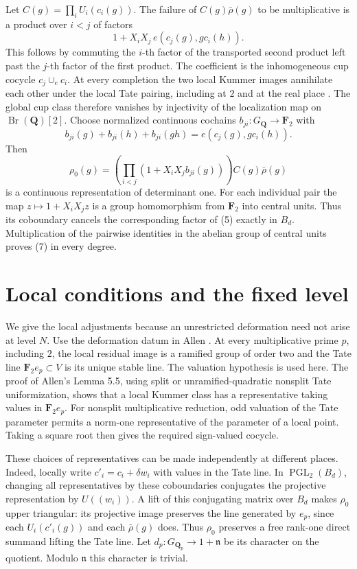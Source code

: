 \documentclass[11pt]{article}
\newcommand{\F}{\mathbf F_2}
\newcommand{\Q}{\mathbf Q}
\newcommand{\n}{\mathfrak n}
\begin{document}
Let \(C(g)=\prod_i U_i(c_i(g))\). The failure of \(C(g)\bar\rho(g)\) to be multiplicative is a product over \(i<j\) of factors
\[
  1+X_iX_j\, e(c_j(g),g c_i(h)).
\tag{5}
\]
This follows by commuting the \(i\)-th factor of the transported second product left past the \(j\)-th factor of the first product. The coefficient is the inhomogeneous cup cocycle \(c_j\cup_e c_i\). At every completion the two local Kummer images annihilate each other under the local Tate pairing, including at \(2\) and at the real place \cite[Proposition 4.10]{pr}. The global cup class therefore vanishes by injectivity of the localization map on \(\operatorname{Br}(\Q)[2]\). Choose normalized continuous cochains \(b_{ji}:G_\Q\to\F\) with
\[
 b_{ji}(g)+b_{ji}(h)+b_{ji}(gh)=e(c_j(g),g c_i(h)).
\tag{6}
\]
Then
\[
 \rho_0(g)=
 \left(\prod_{i<j}(1+X_iX_j b_{ji}(g))\right)
 C(g)\bar\rho(g)
\tag{7}
\]
is a continuous representation of determinant one. For each individual pair the map \(z\mapsto 1+X_iX_jz\) is a group homomorphism from \(\F\) into central units. Thus its coboundary cancels the corresponding factor of (5) exactly in \(B_d\). Multiplication of the pairwise identities in the abelian group of central units proves (7) in every degree.

\section{Local conditions and the fixed level}
We give the local adjustments because an unrestricted deformation need not arise at level \(N\). Use the deformation datum in Allen \cite[\S5.8]{allen}. At every multiplicative prime \(p\), including \(2\), the local residual image is a ramified group of order two and the Tate line \(\F e_p\subset V\) is its unique stable line. The valuation hypothesis is used here. The proof of Allen's Lemma 5.5, using split or unramified-quadratic nonsplit Tate uniformization, shows that a local Kummer class has a representative taking values in \(\F e_p\). For nonsplit multiplicative reduction, odd valuation of the Tate parameter permits a norm-one representative of the parameter of a local point. Taking a square root then gives the required sign-valued cocycle.

These choices of representatives can be made independently at different places. Indeed, locally write \(c'_i=c_i+\delta w_i\) with values in the Tate line. In \(\operatorname{PGL}_2(B_d)\), changing all representatives by these coboundaries conjugates the projective representation by \(U((w_i))\). A lift of this conjugating matrix over \(B_d\) makes \(\rho_0\) upper triangular: its projective image preserves the line generated by \(e_p\), since each \(U_i(c'_i(g))\) and each \(\bar\rho(g)\) does. Thus \(\rho_0\) preserves a free rank-one direct summand lifting the Tate line. Let \(d_p:G_{\Q_p}\to 1+\n\) be its character on the quotient. Modulo \(\n\) this character is trivial.
\end{document}
